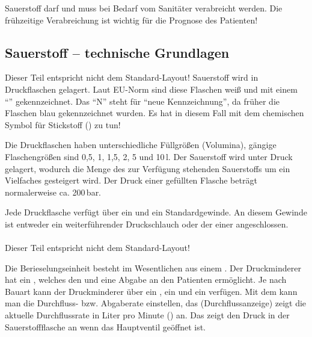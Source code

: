 Sauerstoff darf und muss bei Bedarf vom Sanitäter
verabreicht werden. Die frühzeitige Verabreichung ist wichtig für die Prognose des
Patienten!

% 

\subsection{Sauerstoff -- technische Grundlagen}
{Dieser Teil entspricht nicht dem Standard-Layout!}
Sauerstoff wird in Druckflaschen  gelagert. Laut EU-Norm sind diese
Flaschen weiß und mit einem
"`"' gekennzeichnet.
Das "`{\sffamily N}"' steht für "`neue Kennzeichnung"', da früher die
Flaschen blau gekennzeichnet wurden. Es hat in diesem Fall 
mit dem chemischen Symbol für Stickstoff () zu tun!

Die Druckflaschen haben unterschiedliche Füllgrößen (Volumina),
gängige Flaschengrößen sind 0,5, 1, 1,5, 2, 5 und
10\,l. Der Sauerstoff wird unter Druck gelagert, wodurch die
Menge des zur Verfügung stehenden Sauerstoffs um ein Vielfaches
gesteigert wird. Der Druck einer gefüllten Flasche beträgt
normalerweise ca. 200\,bar. 

Jede Druckflasche verfügt über ein  und
ein Standardgewinde. An diesem Gewinde ist entweder ein
weiterführender Druckschlauch oder der 
einer  angeschlossen. 

\paragraph{}
{Dieser Teil entspricht nicht dem Standard-Layout!}

Die Berieselungseinheit besteht im Wesentlichen aus einem . Der
Druckminderer hat ein , welches den  und eine
Abgabe an den Patienten ermöglicht. Je nach Bauart kann der Druckminderer über 
ein , ein  und ein 
verfügen.  Mit dem  kann man die Durchfluss- bzw. Abgaberate
ein\-stellen,  das  (Durchflussanzeige) zeigt die aktuelle
Durchflussrate in  Liter pro Minute (\LMin) an. Das   zeigt den
Druck in der Sauerstoffflasche an wenn das Hauptventil geöffnet ist.

